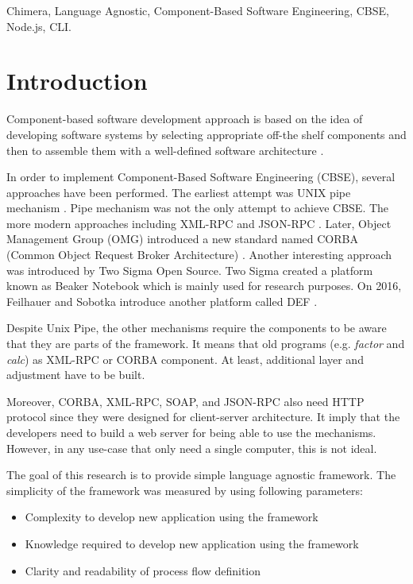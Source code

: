 \documentclass[conference]{IEEEtran}
\begin{document}
\begin{IEEEkeywords}
Chimera, Language Agnostic, Component-Based Software Engineering, CBSE, Node.js, CLI.
\end{IEEEkeywords}

\IEEEpeerreviewmaketitle

\section{Introduction}

Component-based software development approach is based on the idea of developing 
software systems by selecting appropriate off-the shelf components and then to 
assemble them with a well-defined software architecture \cite{kaur2010component}.

In order to implement Component-Based Software Engineering (CBSE), several 
approaches have been performed. The earliest attempt was UNIX pipe mechanism 
\cite{mcilroy1968mass}. Pipe mechanism was not the only attempt to achieve CBSE.
The more modern approaches including XML-RPC \cite{xmlrpc} and JSON-RPC \cite{jsonrpc}. 
Later, Object Management Group (OMG) introduced a new standard named CORBA (Common
Object Request Broker Architecture) \cite{corba}. Another interesting approach was 
introduced by Two Sigma Open Source. Two Sigma created a platform known as Beaker
Notebook \cite{beakernotebook} which is mainly used for research purposes. 
On 2016, Feilhauer and Sobotka introduce another platform called DEF 
\cite{feilhauer2016def}.

Despite Unix Pipe, the other mechanisms require the components to be aware that 
they are parts of the framework. It means that old programs (e.g.
{\it factor} and {\it calc}) as XML-RPC or CORBA component. At least, additional layer
and adjustment have to be built.

Moreover, CORBA, XML-RPC, SOAP, and JSON-RPC also need HTTP protocol since they were designed for 
client-server architecture. It imply that the developers need to build a web server for being able 
to use the mechanisms. However, in any use-case that only need a single computer,
this is not ideal.

The goal of this research is to provide simple language agnostic framework. The simplicity of 
the framework was measured by using following parameters:

\begin{itemize}
    \item Complexity to develop new application using the framework
    \item Knowledge required to develop new application using the framework
    \item Clarity and readability of process flow definition
\end{itemize}
\end{document}
